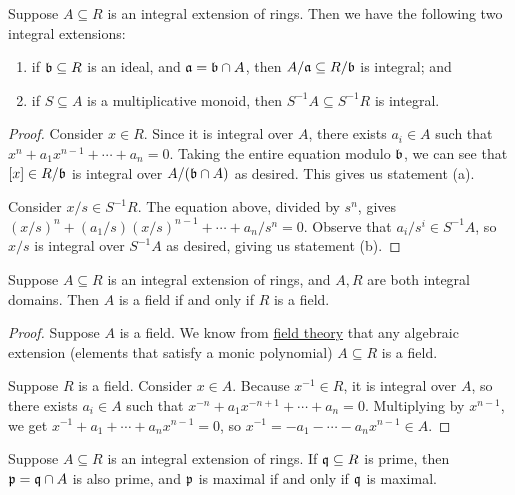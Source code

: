\begin{lemma}\label{lem:integral-ideal-extension}
    Suppose \(A \subseteq R\) is an integral extension of rings.
    Then we have the following two integral extensions:
    \begin{enumerate}[label={(\alph*)}, itemsep=0mm]
        \item if \(\mathfrak{b} \subseteq R\) is an ideal, and \(\mathfrak{a} = \mathfrak{b} \cap A\),
            then \(A/\mathfrak{a} \subseteq R/\mathfrak{b}\) is integral; and
        \item if \(S \subseteq A\) is a multiplicative monoid,
            then \(S^{-1}A \subseteq S^{-1}R\) is integral.
    \end{enumerate}
\end{lemma}
\begin{proof}
    Consider \(x \in R\).
    Since it is integral over \(A\),
    there exists \(a_i \in A\) such that \(x^n + a_1x^{n-1} + \cdots + a_n = 0\).
    Taking the entire equation modulo \(\mathfrak{b}\),
    we can see that \([x] \in R/\mathfrak{b}\) is integral over \(A/(\mathfrak{b} \cap A)\) as desired.
    This gives us statement (a).

    Consider \(x/s \in S^{-1}R\).
    The equation above, divided by \(s^n\),
    gives \({(x/s)}^n + (a_1/s){(x/s)}^{n-1} + \cdots + a_n/s^n = 0\).
    Observe that \(a_i/s^i \in S^{-1}A\),
    so \(x/s\) is integral over \(S^{-1}A\) as desired,
    giving us statement (b).
\end{proof}
\begin{theorem}\label{thm:integral-field-extension}
    Suppose \(A \subseteq R\) is an integral extension of rings,
    and \(A,R\) are both integral domains.
    Then \(A\) is a field if and only if \(R\) is a field.
\end{theorem}
\begin{proof}
    Suppose \(A\) is a field.
    We know from \hyperref[sec:algebraic-extensions]{field theory}
    that any algebraic extension (elements that satisfy a monic polynomial)
    \(A \subseteq R\) is a field.

    Suppose \(R\) is a field.
    Consider \(x \in A\).
    Because \(x^{-1} \in R\), it is integral over \(A\),
    so there exists \(a_i \in A\) such that
    \(x^{-n} + a_1 x^{-n+1} + \cdots + a_n = 0\).
    Multiplying by \(x^{n-1}\),
    we get \(x^{-1} + a_1 + \cdots + a_n x^{n-1} = 0\),
    so \(x^{-1} = - a_1 - \cdots - a_n x^{n-1} \in A\).
\end{proof}
\begin{corollary}\label{cor:integral-maximal-ideal}
    Suppose \(A \subseteq R\) is an integral extension of rings.
    If \(\mathfrak{q} \subseteq R\) is prime, then \(\mathfrak{p} = \mathfrak{q} \cap A\) is also prime,
    and \(\mathfrak{p}\) is maximal if and only if \(\mathfrak{q}\) is maximal.
\end{corollary}
